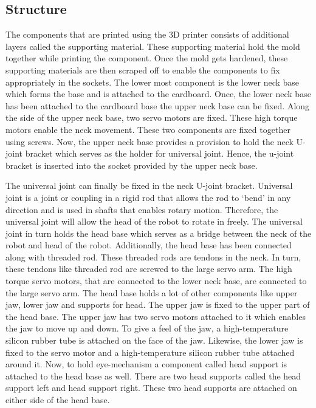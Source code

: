 \documentclass[letterpaper,12pt]{article}
\begin{document}
\begin{multicols}{2}
\section{Structure}
The components that are printed using the 3D printer consists of additional layers called the supporting material. These supporting material hold the mold together while printing the component. Once the mold gets hardened, these supporting materials are then scraped off to enable the components to fix appropriately in the sockets. The lower most component is the lower neck base which forms the base and is attached to the cardboard. Once, the lower neck base has been attached to the cardboard base the upper neck base can be fixed. Along the side of the upper neck base, two servo motors are fixed. These high torque motors enable the neck movement. These two components are fixed together using screws. Now, the upper neck base provides a provision to hold the neck U-joint bracket which serves as the holder for universal joint. Hence, the u-joint bracket is inserted into the socket provided by the upper neck base. \\
\par
The universal joint can finally be fixed in the neck U-joint bracket. Universal joint is a joint or  coupling in a rigid rod that allows the rod to ‘bend’ in any direction and is used in shafts that enables rotary motion. Therefore, the universal joint will allow the head of the robot to rotate in freely. The universal joint in turn holds the head base which serves as a bridge between the neck of the robot and head of the robot. Additionally, the head base has been connected along with threaded rod. These threaded rods are tendons in the neck. In turn, these tendons like threaded rod are screwed to the large servo arm. The high torque servo motors, that are connected to the lower neck base, are connected to the large servo arm. The head base holds a lot of other components like upper jaw, lower jaw and supports for head. The upper jaw is fixed to the upper part of the head base. The upper jaw has two servo motors attached to it which enables the jaw to move up and down. To give a feel of the jaw, a high-temperature silicon rubber tube is attached on the face of the jaw. Likewise, the lower jaw is fixed to the servo motor and a high-temperature silicon rubber tube attached around it. Now, to hold eye-mechanism a component called head support is attached to the head base as well. There are two head supports called the head support left and head support right. These two head supports are attached on either side of the head base. \\

\end{multicols}
\end{document}
